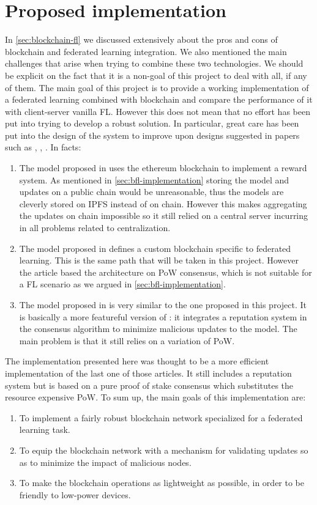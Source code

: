 \section{Proposed implementation}\label{chap:implementation}
In \ref{sec:blockchain-fl} we discussed extensively about the pros and cons of blockchain and federated
learning integration.
We also mentioned the main challenges that arise when trying to combine these two technologies. We should be
explicit on the fact that it is a non-goal of this project to
deal with all, if any of them. The main goal of this project is to provide a working implementation of a
federated learning combined with blockchain and compare the performance of it with client-server vanilla FL.
However this does not mean that no effort has been put into trying to develop a robust solution.
In particular, great care has been put into the design of the system to improve upon designs suggested in
papers such as \cite{FlwrBC}, \cite{BlockFL}, \cite{VBFL}.
In facts:
\begin{enumerate}
  \item The model proposed in \cite{FlwrBC} uses the ethereum blockchain to implement a reward system.
    As mentioned in \ref{sec:bfl-implementation} storing the model and updates on a public chain would be
    unreasonable, thus the models are cleverly stored on IPFS instead of on chain. However this makes
    aggregating the updates on chain impossible so it still relied on a central server incurring in all
    problems related to centralization.
  \item The model proposed in \cite{BlockFL} defines a custom blockchain specific to federated learning. This
    is the same path that will be taken in this project. However the article based the architecture on PoW consensus,
    which is not suitable for a FL scenario as we argued in \ref{sec:bfl-implementation}.
  \item The model proposed in \cite{VBFL} is very similar to the one proposed in this project. It is
    basically a more featureful version of \cite{BlockFL}: it integrates a reputation system in the consensus
    algorithm to minimize malicious updates to the model. The main problem is that it still relies on a
    variation of PoW.

\end{enumerate}

The implementation presented here was thought to be a more efficient implementation of the last one of those articles.
It still includes a reputation system but is based on a pure proof of stake consensus which substitutes the
resource expensive PoW.
To sum up, the main goals of this implementation are:
\begin{enumerate}
  \item To implement a fairly robust blockchain network specialized for a federated learning task.
  \item To equip the blockchain network with a mechanism for validating updates so as to minimize the
    impact of malicious nodes.
  \item To make the blockchain operations as lightweight as possible, in order to be friendly to low-power devices.
\end{enumerate}

